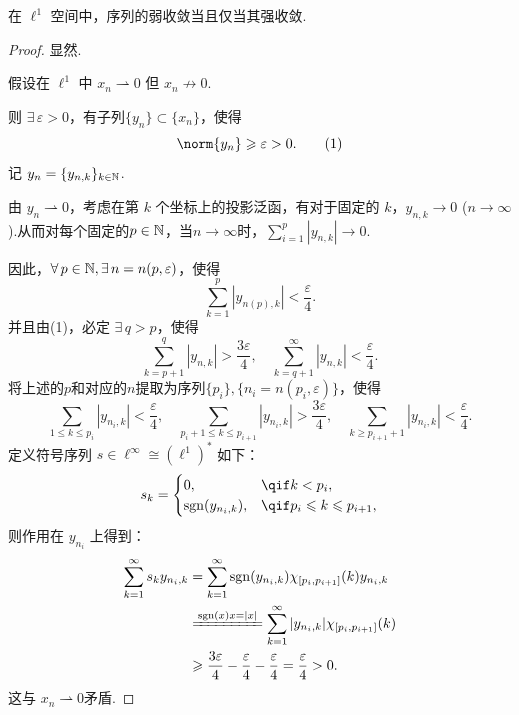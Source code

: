\begin{theorem}[Schur 定理]
    在 $\ell^1$ 空间中，序列的弱收敛当且仅当其强收敛.
\end{theorem}
\begin{proof}
    \fbox{$\Leftarrow$} 显然.\par
    \fbox{$\Rightarrow$} 假设在 $\ell^1$ 中 $x_n \rightharpoonup 0$ 但 $x_n \not\to 0$.\par
    则 $\exists\, \varepsilon > 0$，有子列$\{y_n\} \subset \{x_n\}$，使得
    \begin{equation*}
        \norm{y_n} \geq \varepsilon > 0.\tag{1}
    \end{equation*}
    记 $y_n = \{y_{n,k}\}_{k \in \mathbb{N}}$.\par
    由 $y_n \rightharpoonup 0$，考虑在第 $k$ 个坐标上的投影泛函，有对于固定的 $k$，$y_{n,k} \to 0$ ($n \to \infty$).从而对每个固定的$p \in \mathbb{N}$，当$n\to \infty$时，$\sum_{i=1}^p|y_{n,k}|\to 0$.\par
    因此，$\forall\, p\in\mathbb{N},\exists\, n = n(p, \varepsilon)$，使得
    \begin{equation*}
        \sum_{k=1}^p |y_{n(p),k}| < \frac{\varepsilon}{4}. \tag{2}
    \end{equation*}
    并且由(1)，必定 $\exists\, q > p$，使得
    \begin{equation*}
        \sum_{k=p+1}^q |y_{n,k}| > \frac{3\varepsilon}{4}, \quad \sum_{k=q+1}^\infty |y_{n,k}| < \frac{\varepsilon}{4}.
    \end{equation*}
    将上述的$p$和对应的$n$提取为序列$\{p_i\},\{n_i=n(p_i,\varepsilon)\}$，使得 
    \begin{equation*}
        \sum_{1 \leq k \leq p_i} |y_{n_i, k}| < \frac{\varepsilon}{4}, \quad \sum_{p_i + 1 \leq k \leq p_{i+1}} |y_{n_i, k}| > \frac{3\varepsilon}{4}, \quad \sum_{k \geq p_{i+1} + 1} |y_{n_i, k}| < \frac{\varepsilon}{4}.
    \end{equation*}
    定义符号序列 $s \in \ell^\infty \cong (\ell^1)^*$ 如下：
    \begin{equation*}
        s_k = \begin{cases}
            0, & \qif k <p_i,\\
            \operatorname{sgn}(y_{n_i, k}), & \qif p_i \leq k \leq p_{i+1},\\
        \end{cases}
    \end{equation*}
    则作用在 $y_{n_i}$ 上得到：
    \begin{align*}
        \sum_{k=1}^\infty s_k y_{n_i, k} &=\sum_{k=1}^\infty\operatorname{sgn}(y_{n_i, k}) \chi_{[p_i, p_{i+1}]}(k)y_{n_i, k}\\
        &\xlongequal{\operatorname{sgn}(x)x=|x|}\sum_{k=1}^\infty |y_{n_i, k}| \chi_{[p_i, p_{i+1}]}(k)\\
        &\geq \frac{3\varepsilon}{4} - \frac{\varepsilon}{4} - \frac{\varepsilon}{4} = \frac{\varepsilon}{4} > 0.
    \end{align*}
    这与 $x_n \rightharpoonup 0$矛盾.
\end{proof}


